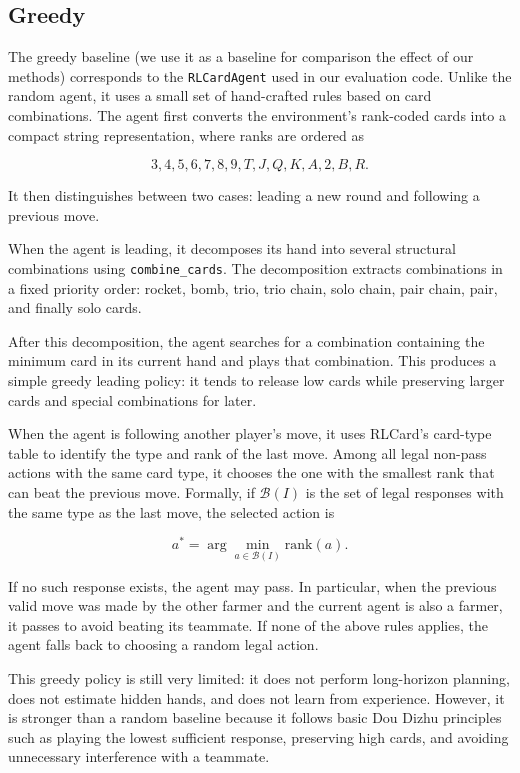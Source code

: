 
\subsection{Greedy}

The greedy baseline (we use it as a baseline for comparison the effect of our methods)
corresponds to the \texttt{RLCardAgent} used in our evaluation code.
Unlike the random agent, it uses a small set of hand-crafted rules based on card combinations.
The agent first converts the environment's rank-coded cards into a compact string representation,
where ranks are ordered as

\[
    3,4,5,6,7,8,9,T,J,Q,K,A,2,B,R.
\]

It then distinguishes between two cases: leading a new round and following a
previous move.

When the agent is leading, it decomposes its hand into several structural
combinations using \texttt{combine\_cards}. The decomposition extracts
combinations in a fixed priority order: rocket, bomb, trio, trio chain, solo
chain, pair chain, pair, and finally solo cards.

After this decomposition, the agent searches for a combination containing the
minimum card in its current hand and plays that combination. This produces a
simple greedy leading policy: it tends to release low cards while preserving
larger cards and special combinations for later.

When the agent is following another player's move, it uses RLCard's card-type
table to identify the type and rank of the last move. Among all legal non-pass
actions with the same card type, it chooses the one with the smallest rank that
can beat the previous move. Formally, if \(\mathcal{B}(I)\) is the set of legal
responses with the same type as the last move, the selected action is

\[
    a^* = \arg\min_{a \in \mathcal{B}(I)} \mathrm{rank}(a).
\]

If no such response exists, the agent may pass. In particular, when the previous
valid move was made by the other farmer and the current agent is also a farmer,
it passes to avoid beating its teammate. If none of the above rules applies, the
agent falls back to choosing a random legal action.

This greedy policy is still very limited: it does not perform long-horizon
planning, does not estimate hidden hands, and does not learn from experience.
However, it is stronger than a random baseline because it follows basic
Dou Dizhu principles such as playing the lowest sufficient response, preserving
high cards, and avoiding unnecessary interference with a teammate.
